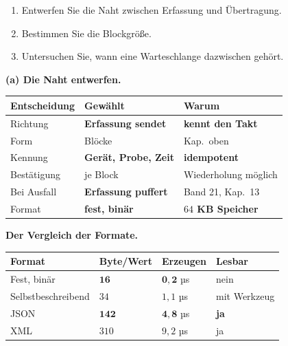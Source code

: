 \begin{aufgabe}
\begin{enumerate}[label=(\alph*)]
\item Entwerfen Sie die Naht zwischen Erfassung und Übertragung.
\item Bestimmen Sie die Blockgröße.
\item Untersuchen Sie, wann eine Warteschlange dazwischen gehört.
\end{enumerate}

\loesung
\textbf{(a) Die Naht entwerfen.}

\begin{center}
{\small
\renewcommand{\arraystretch}{1.45}
\begin{tabular}{@{}P{2.8cm}P{2.6cm}P{2.6cm}@{}}
\toprule
\textbf{Entscheidung} & \textbf{Gewählt} & \textbf{Warum}\\
\midrule
Richtung & \textbf{Erfassung sendet} & \textbf{kennt den Takt}\\
Form & Blöcke & \textcolor{gruen}{Kap.\ oben}\\
Kennung & \textbf{Gerät, Probe, Zeit} & \textcolor{gruen}{\textbf{idempotent}}\\
Bestätigung & je Block & \textcolor{gruen}{Wiederholung möglich}\\
Bei Ausfall & \textbf{Erfassung puffert} & \textcolor{gruen}{Band 21, Kap.~13}\\
Format & \textbf{fest, binär} & \textbf{$64$ KB Speicher}\\
\bottomrule
\end{tabular}}
\end{center}

\begin{center}
\begin{minipage}{0.88\textwidth}
\end{minipage}
\end{center}

\textbf{Der Vergleich der Formate.}

\begin{center}
{\small
\renewcommand{\arraystretch}{1.45}
\begin{tabular}{@{}P{2.8cm}P{1.8cm}P{1.8cm}P{2.0cm}@{}}
\toprule
\textbf{Format} & \textbf{Byte/Wert} & \textbf{Erzeugen} & \textbf{Lesbar}\\
\midrule
Fest, binär & $\mathbf{16}$ & \textcolor{gruen}{$\mathbf{0{,}2}$ µs} & \textcolor{akzent}{nein}\\
Selbst\-beschreibend & $34$ & $1{,}1$ µs & \textcolor{mittel}{mit Werkzeug}\\
JSON & $\mathbf{142}$ & \textcolor{akzent}{$\mathbf{4{,}8}$ µs} & \textcolor{gruen}{\textbf{ja}}\\
XML & $310$ & $9{,}2$ µs & \textcolor{gruen}{ja}\\
\bottomrule
\end{tabular}}
\end{center}


\end{aufgabe}
